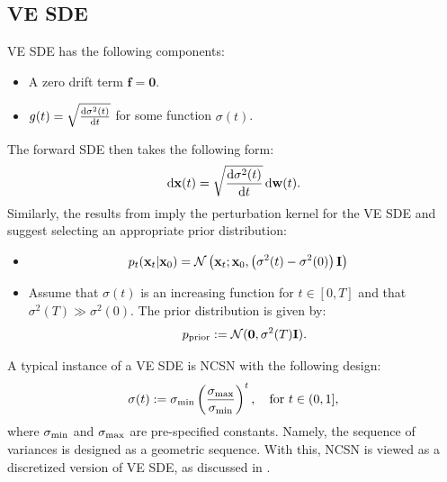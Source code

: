 \subsection{VE SDE}
VE SDE has the following components:
\begin{itemize}
    \item {} A zero drift term $\mathbf{f}=\bm{0}$.
    \item {} $g(t)=\sqrt{\frac{\mathop{}\!\mathrm{d} \sigma^2(t)}{\mathop{}\!\mathrm{d} t}}$ for some function $\sigma(t)$.
\end{itemize}
The forward SDE then takes the following form:
\begin{equation}\label{eq:vesde}
    \mathop{}\!\mathrm{d}{\mathbf{x}}(t) =  \sqrt{\frac{\mathop{}\!\mathrm{d} \sigma^2(t)}{\mathop{}\!\mathrm{d} t}} \mathop{}\!\mathrm{d}{\mathbf{w}}(t).
\end{equation} 
Similarly, the results from  imply the perturbation kernel for the VE SDE and suggest selecting an appropriate prior distribution:
\begin{itemize}
    \item {}
\begin{align*}
        p_t({\mathbf{x}}_t | {\mathbf{x}}_0) &= \mathcal{N}\left({\mathbf{x}}_t ; {\mathbf{x}}_0, \left(\sigma^2(t) - \sigma^2(0)\right){\mathbf{I}}\right) 
\end{align*}
    \item {} Assume that $\sigma(t)$ is an increasing function for $t \in [0,T]$ and that $\sigma^2(T) \gg \sigma^2(0)$. The prior distribution is given by:
    \[
    p_{\mathrm{prior}} := \mathcal{N}(\bm{0}, \sigma^2(T){\mathbf{I}}).
    \]
\end{itemize}

A typical instance of a VE SDE is NCSN with the following design:
\[
\sigma(t):=\sigma_{\textup{min}}\left(\frac{\sigma_{\textup{max}}}{\sigma_{\textup{min}}} \right)^t,\quad \text{for } t\in(0,1],
\]
where $\sigma_{\textup{min}}$ and $\sigma_{\textup{max}}$ are pre-specified constants. Namely, the sequence of variances is designed as a geometric sequence. With this, NCSN is viewed as a discretized version of VE SDE, as discussed in .

